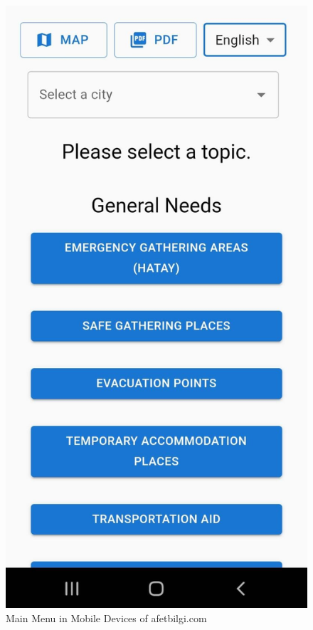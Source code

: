 \begin{figure}[H]
    \begin{center}
        \includegraphics[scale = 0.10]{assets/mainmenu.jpeg}
        \caption[Main Menu in Mobile Devices]{Main Menu in Mobile Devices of afetbilgi.com}
    \end{center}
\end{figure}

